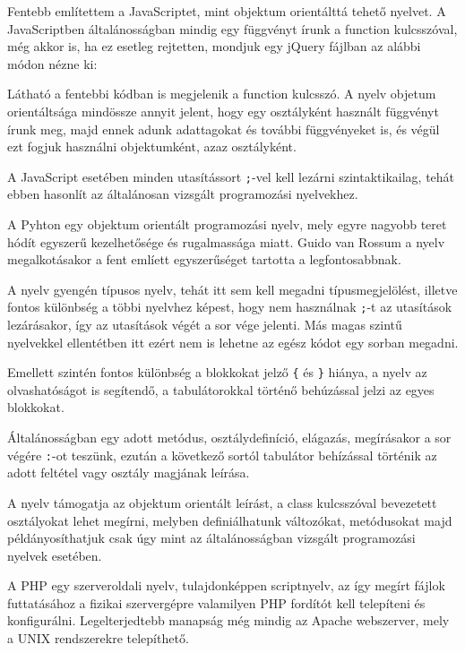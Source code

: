 Fentebb említettem a JavaScriptet, mint objektum orientálttá tehető nyelvet. A JavaScriptben általánosságban mindig egy függvényt írunk a function kulcsszóval, még akkor is, ha ez esetleg rejtetten, mondjuk egy jQuery fájlban az alábbi módon nézne ki:


Látható a fentebbi kódban is megjelenik a function kulcsszó. A nyelv objetum orientáltsága mindössze annyit jelent, hogy egy osztályként használt függvényt írunk meg, majd ennek adunk adattagokat és további függvényeket is, és végül ezt fogjuk használni objektumként, azaz osztályként.

A JavaScript esetében minden utasítássort \texttt{;}-vel kell lezárni szintaktikailag, tehát ebben hasonlít az általánosan vizsgált programozási nyelvekhez.

A Pyhton egy objektum orientált programozási nyelv, mely egyre nagyobb teret hódít egyszerű kezelhetősége és rugalmassága miatt. Guido van Rossum a nyelv megalkotásakor a fent emlíett egyszerűséget tartotta a legfontosabbnak.

A nyelv gyengén típusos nyelv, tehát itt sem kell megadni típusmegjelölést, illetve fontos különbség a többi nyelvhez képest, hogy nem használnak \texttt{;}-t az utasítások lezárásakor, így az utasítások végét a sor vége jelenti. Más magas szintű nyelvekkel ellentétben itt ezért nem is lehetne az egész kódot egy sorban megadni.

Emellett szintén fontos különbség a blokkokat jelző \texttt{\{} és \texttt{\}} hiánya, a nyelv az olvashatóságot is segítendő, a tabulátorokkal történő behúzással jelzi az egyes blokkokat.

Általánosságban egy adott metódus, osztálydefiníció, elágazás, megírásakor a sor végére \texttt{:}-ot teszünk, ezután a következő sortól tabulátor behízással történik az adott feltétel vagy osztály magjának leírása.

A nyelv támogatja az objektum orientált leírást, a class kulcsszóval bevezetett osztályokat lehet megírni, melyben definiálhatunk változókat, metódusokat majd példányosíthatjuk csak úgy mint az általánosságban vizsgált programozási nyelvek esetében.

A PHP egy szerveroldali nyelv, tulajdonképpen scriptnyelv, az így megírt fájlok futtatásához a fizikai szervergépre valamilyen PHP fordítót kell telepíteni és konfigurálni. Legelterjedtebb manapság még mindig az Apache webszerver, mely a UNIX rendszerekre telepíthető.


